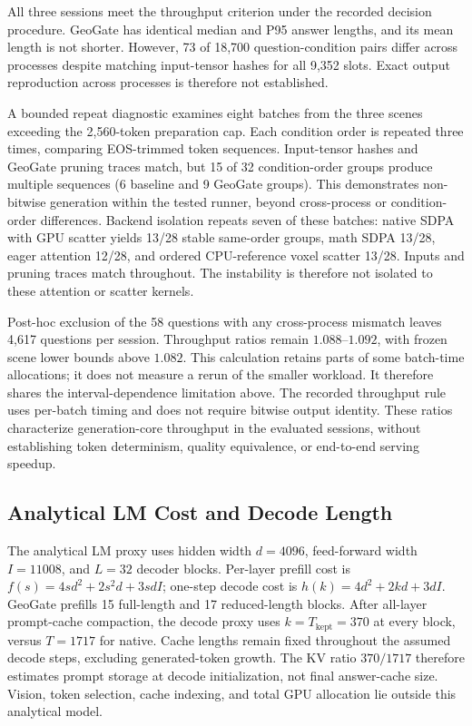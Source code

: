 All three sessions meet the throughput criterion under the recorded decision procedure. GeoGate has identical median and P95 answer lengths, and its mean length is not shorter. However, 73 of 18,700 question-condition pairs differ across processes despite matching input-tensor hashes for all 9,352 slots. Exact output reproduction across processes is therefore not established.

A bounded repeat diagnostic examines eight batches from the three scenes exceeding the 2,560-token preparation cap. Each condition order is repeated three times, comparing EOS-trimmed token sequences. Input-tensor hashes and GeoGate pruning traces match, but 15 of 32 condition-order groups produce multiple sequences (6 baseline and 9 GeoGate groups). This demonstrates non-bitwise generation within the tested runner, beyond cross-process or condition-order differences. Backend isolation repeats seven of these batches: native SDPA with GPU scatter yields 13/28 stable same-order groups, math SDPA 13/28, eager attention 12/28, and ordered CPU-reference voxel scatter 13/28. Inputs and pruning traces match throughout. The instability is therefore not isolated to these attention or scatter kernels.

Post-hoc exclusion of the 58 questions with any cross-process mismatch leaves 4,617 questions per session. Throughput ratios remain $1.088$--$1.092$, with frozen scene lower bounds above $1.082$. This calculation retains parts of some batch-time allocations; it does not measure a rerun of the smaller workload. It therefore shares the interval-dependence limitation above. The recorded throughput rule uses per-batch timing and does not require bitwise output identity. These ratios characterize generation-core throughput in the evaluated sessions, without establishing token determinism, quality equivalence, or end-to-end serving speedup.

\subsection{Analytical LM Cost and Decode Length}
The analytical LM proxy uses hidden width $d=4096$, feed-forward width $I=11008$, and $L=32$ decoder blocks. Per-layer prefill cost is $f(s)=4sd^2+2s^2d+3sdI$; one-step decode cost is $h(k)=4d^2+2kd+3dI$. GeoGate prefills 15 full-length and 17 reduced-length blocks. After all-layer prompt-cache compaction, the decode proxy uses $k=T_{\text{kept}}=370$ at every block, versus $T=1717$ for native. Cache lengths remain fixed throughout the assumed decode steps, excluding generated-token growth. The KV ratio $370/1717$ therefore estimates prompt storage at decode initialization, not final answer-cache size. Vision, token selection, cache indexing, and total GPU allocation lie outside this analytical model.

